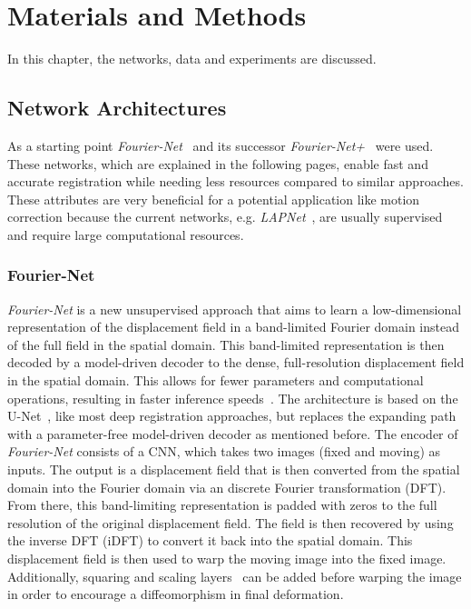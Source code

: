 \documentclass[english,version-2022-01]{uzl-thesis} %
\begin{document}

\chapter{Materials and Methods} \label{Ch:MasterialsAndMethods}
In this chapter, the networks, data and experiments are discussed.

\section{Network Architectures} \label{Sec:NetworkArchitecture}
As a starting point \emph{Fourier-Net}~\cite{Fourier-Net} and its successor \emph{Fourier-Net+}~\cite{Fourier-Net+} were used. These networks, which are explained in the following pages, enable fast and accurate registration while needing less resources compared to similar approaches. These attributes are very beneficial for a potential application like motion correction because the current networks, e.g. \emph{LAPNet}~\cite{LAPNet}, are usually supervised and require large computational resources.

\subsection{Fourier-Net}	\label{SubSec:Fourier-Net}
\emph{Fourier-Net} is a new unsupervised approach that aims to learn a low-dimensional representation of the displacement field in a band-limited Fourier domain instead of the full field in the spatial domain. This band-limited representation is then decoded by a model-driven decoder to the dense, full-resolution displacement field in the spatial domain. This allows for fewer parameters and computational operations, resulting in faster inference speeds~\cite{Fourier-Net}. The architecture is based on the U-Net~\cite{U-Net}, like most deep registration approaches, but replaces the expanding path with a parameter-free model-driven decoder as mentioned before. The encoder of \emph{Fourier-Net} consists of a CNN, which takes two images (fixed and moving) as inputs. The output is a displacement field that is then converted from the spatial domain into the Fourier domain via an discrete Fourier transformation (DFT). From there, this band-limiting representation 
is padded with zeros to the full resolution of the original displacement field. The field is then recovered by using the inverse DFT (iDFT) to convert it back into the spatial domain. This displacement field is then used to warp the moving image into the fixed image. Additionally, squaring and scaling layers~\cite{Dalca2018} can be added before warping the image in order to encourage a diffeomorphism in final deformation. 
\end{document}
